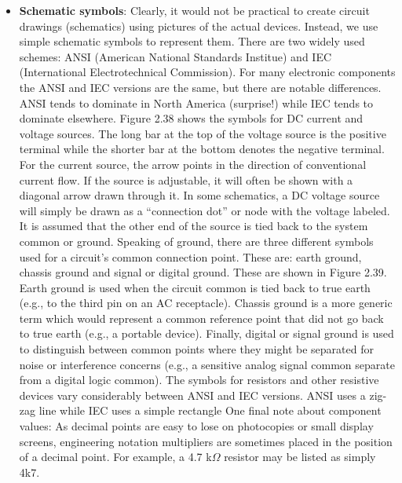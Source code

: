 \documentclass{report}
\begin{document}
\begin{itemize}
            \bigbreak \noindent 
        \item \textbf{Schematic symbols}: Clearly, it would not be practical to create circuit drawings (schematics) using pictures of the actual devices. Instead, we use simple schematic symbols to represent them. There are two widely used schemes: ANSI (American National Standards Institue) and IEC (International Electrotechnical Commission). For many electronic components the ANSI and IEC versions are the same, but there are notable differences. ANSI tends to dominate in North America (surprise!) while IEC tends to dominate elsewhere. 
            \bigbreak \noindent 
            Figure 2.38 shows the symbols for DC current and voltage sources. The long bar at the top of the voltage source is the positive terminal while the shorter bar at the bottom denotes the negative terminal. For the current source, the arrow points in the direction of conventional current flow. If the source is adjustable, it will often be shown with a diagonal arrow drawn through it. In some schematics, a DC voltage source will simply be drawn as a “connection dot” or node with the voltage labeled. It is assumed that the other end of the source is tied back to the system common or ground.
            \bigbreak \noindent 
            \bigbreak \noindent 
            Speaking of ground, there are three different symbols used for a circuit's common connection point. These are: earth ground, chassis ground and signal or digital ground. These are shown in Figure 2.39. Earth ground is used when the circuit common is tied back to true earth (e.g., to the third pin on an AC receptacle). Chassis ground is a more generic term which would represent a common reference point that did not go back to true earth (e.g., a portable device). Finally, digital or signal ground is used to distinguish between common points where they might be separated for noise or interference concerns (e.g., a sensitive analog signal common separate from a digital logic common).
            \bigbreak \noindent 
            \bigbreak \noindent 
            The symbols for resistors and other resistive devices vary considerably between ANSI and IEC versions. ANSI uses a zig-zag line while IEC uses a simple rectangle
            \bigbreak \noindent 
            One final note about component values: As decimal points are easy to lose on photocopies or small display screens, engineering notation multipliers are sometimes placed in the position of a decimal point. For example, a 4.7 k$\Omega$ resistor may be listed as simply 4k7.

    \end{itemize}
\end{document}
